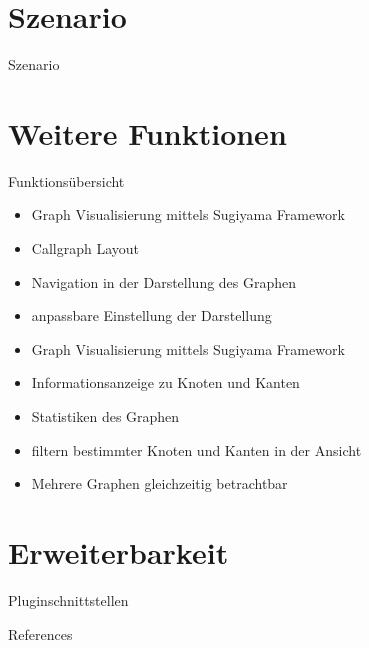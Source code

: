 \documentclass[18pt]{beamer}
\begin{document}
\section{Szenario}
\begin{frame}{Szenario}
\end{frame}

\section{Weitere Funktionen}
\begin{frame}{Funktionsübersicht}
\begin{itemize}
\item Graph Visualisierung mittels Sugiyama Framework
\pause
\item Callgraph Layout
\pause
\item Navigation in der Darstellung des Graphen
\pause
\item anpassbare Einstellung der Darstellung
\pause
\item Graph Visualisierung mittels Sugiyama Framework
\pause
\item Informationsanzeige zu Knoten und Kanten
\pause
\item Statistiken des Graphen
\pause
\item filtern bestimmter Knoten und Kanten in der Ansicht
\pause
\item Mehrere Graphen gleichzeitig betrachtbar
\pause
\end{itemize}
\end{frame}

\section{Erweiterbarkeit}
\begin{frame}{Pluginschnittstellen}
\end{frame}
\appendix
\beginbackup

\begin{frame}[allowframebreaks]{References}

\end{frame}

\backupend
\end{document}
